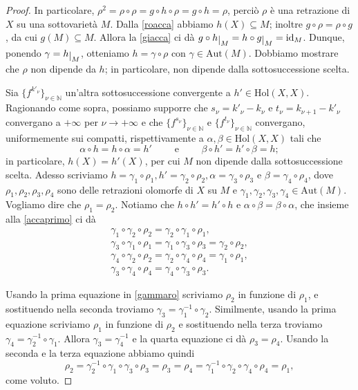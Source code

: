 \begin{proof}
    In particolare, $\rho^2=\rho\circ\rho=g\circ h\circ\rho=g\circ h=\rho$, perciò $\rho$ è una retrazione di $X$ su una sottovarietà $M$. Dalla \eqref{roacca} abbiamo $h(X)\subseteq M$; inoltre $g\circ\rho=\rho\circ g$, da cui $g(M)\subseteq M$. Allora la \eqref{giacca} ci dà $g\circ h\restrict{M}=h\circ g\restrict{M}=\id_M$. Dunque, ponendo $\gamma=h\restrict{M}$, otteniamo $h=\gamma\circ\rho$ con $\gamma\in\text{Aut}(M)$. Dobbiamo mostrare che $\rho$ non dipende da $h$; in particolare, non dipende dalla sottosuccessione scelta.

    Sia $\{f^{k'_\nu}\}_{\nu\in\mathbb{N}}$ un'altra sottosuccessione convergente a $h'\in\text{Hol}(X,X)$. Ragionando come sopra, possiamo supporre che $s_\nu=k'_\nu-k_\nu$ e $t_\nu=k_{\nu+1}-k'_\nu$ convergano a $+\infty$ per $\nu\longrightarrow+\infty$ e che $\{f^{s_\nu}\}_{\nu\in\mathbb{N}}$ e $\{f^{t_\nu}\}_{\nu\in\mathbb{N}}$ convergano, uniformemente sui compatti, rispettivamente a $\alpha,\beta \in \text{Hol}(X,X)$ tali che
    \begin{equation}\label{accaprimo}
        \alpha\circ h=h\circ\alpha=h' \qquad\text{ e }\qquad \beta\circ h'=h'\circ\beta=h;
    \end{equation}
    in particolare, $h(X)=h'(X)$, per cui $M$ non dipende dalla sottosuccessione scelta. Adesso scriviamo $h=\gamma_1\circ\rho_1,h'=\gamma_2\circ\rho_2,\alpha=\gamma_3\circ\rho_3$ e $\beta=\gamma_4\circ\rho_4$, dove $\rho_1,\rho_2,\rho_3,\rho_4$ sono delle retrazioni olomorfe di $X$ su $M$ e $\gamma_1,\gamma_2,\gamma_3,\gamma_4\in\text{Aut}(M)$. Vogliamo dire che $\rho_1=\rho_2$. Notiamo che $h\circ h'=h'\circ h$ e $\alpha\circ\beta=\beta\circ\alpha$, che insieme alla \eqref{accaprimo} ci dà
    \begin{equation}\label{gammaro}\begin{split}
        \gamma_1\circ\gamma_2\circ\rho_2=\gamma_2\circ\gamma_1\circ\rho_1,\\
        \gamma_3\circ\gamma_1\circ\rho_1=\gamma_1\circ\gamma_3\circ\rho_3=\gamma_2\circ\rho_2,\\
        \gamma_4\circ\gamma_2\circ\rho_2=\gamma_2\circ\gamma_4\circ\rho_4=\gamma_1\circ\rho_1,\\
        \gamma_3\circ\gamma_4\circ\rho_4=\gamma_4\circ\gamma_3\circ\rho_3.
    \end{split}\end{equation}

    Usando la prima equazione in \eqref{gammaro} scriviamo $\rho_2$ in funzione di $\rho_1$, e sostituendo nella seconda troviamo $\gamma_3=\gamma_1^{-1}\circ\gamma_2$. Similmente, usando la prima equazione scriviamo $\rho_1$ in funzione di $\rho_2$ e sostituendo nella terza troviamo $\gamma_4=\gamma_2^{-1}\circ\gamma_1$. Allora $\gamma_3=\gamma_4^{-1}$ e la quarta equazione ci dà $\rho_3=\rho_4$. Usando la seconda e la terza equazione abbiamo quindi
    $$\rho_2=\gamma_2^{-1}\circ\gamma_1\circ\gamma_3\circ\rho_3=\rho_3=\rho_4=\gamma_1^{-1}\circ\gamma_2\circ\gamma_4\circ\rho_4=\rho_1,$$
    come voluto.


\end{proof}
